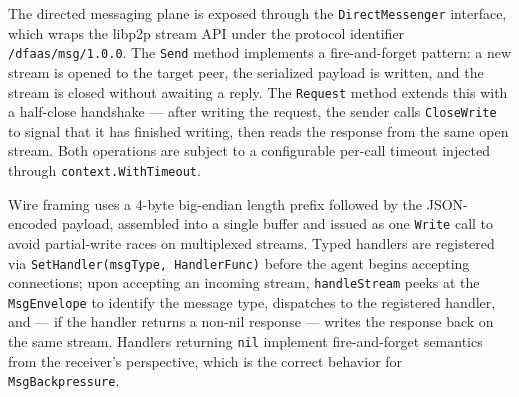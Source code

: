The directed messaging plane is exposed through the \texttt{DirectMessenger}
interface, which wraps the libp2p stream \ac{API} under the protocol identifier
\texttt{/dfaas/msg/1.0.0}.
The \texttt{Send} method implements a fire-and-forget pattern: a new stream is
opened to the target peer, the serialized payload is written, and the stream is
closed without awaiting a reply.
The \texttt{Request} method extends this with a half-close handshake — after
writing the request, the sender calls \texttt{CloseWrite} to signal that it has
finished writing, then reads the response from the same open stream.
Both operations are subject to a configurable per-call timeout injected through
\texttt{context.WithTimeout}.

Wire framing uses a 4-byte big-endian length prefix followed by the
\ac{JSON}-encoded payload, assembled into a single buffer and issued as one
\texttt{Write} call to avoid partial-write races on multiplexed streams.
Typed handlers are registered via \texttt{SetHandler(msgType,~HandlerFunc)}
before the agent begins accepting connections; upon accepting an incoming stream,
\texttt{handleStream} peeks at the \texttt{MsgEnvelope} to identify the message
type, dispatches to the registered handler, and — if the handler returns a
non-nil response — writes the response back on the same stream.
Handlers returning \texttt{nil} implement fire-and-forget semantics from the
receiver's perspective, which is the correct behavior for \texttt{MsgBackpressure}.
